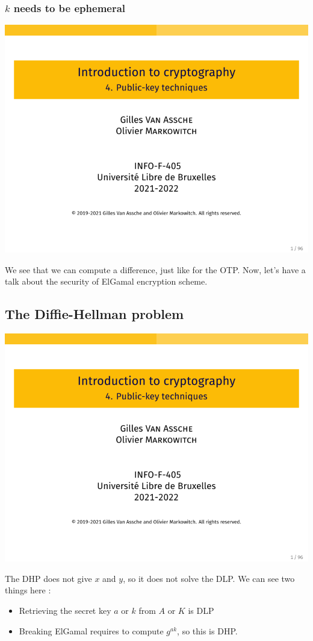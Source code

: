\documentclass[../Cryptography.tex]{subfiles}
\begin{document}
\subsubsection{$k$ needs to be ephemeral}
\begin{center}
    \includegraphics[width=0.6\linewidth, page=70]{Slides/4-Public.pdf}
\end{center}
We see that we can compute a difference, just like for the OTP. 
Now, let's have a talk about the security of ElGamal encryption scheme.
\subsection{The Diffie-Hellman problem}
\begin{center}
    \includegraphics[width=0.8\linewidth, page=71]{Slides/4-Public.pdf}
\end{center}

The DHP does not give $x$ and $y$, so it does not solve the DLP.
We can see two things here :
\begin{itemize}
    \item Retrieving the secret key $a$ or $k$ from $A$ or $K$ is DLP
    \item Breaking ElGamal requires to compute $g^{ak}$, so this is DHP.
\end{itemize}
\end{document}
